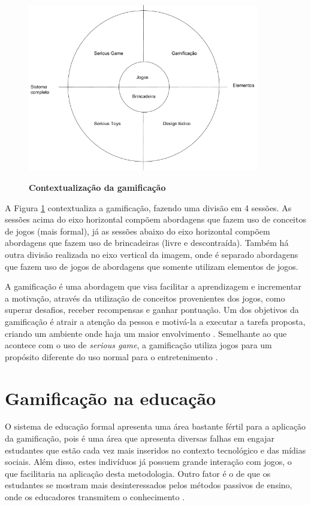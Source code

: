 \documentclass[
	12pt,				%
	oneside,			%
	a4paper,			%
	english,			%
	french,				%
	spanish,			%
	brazil,				%
	]{abntex2}
\begin{document}
\begin{figure}[ht]
\centering
\caption{\textbf{Contextualização da gamificação }}
\includegraphics[width=0.9\textwidth]{imagens/gamificacao.png}
\label{fig:gamificacao}
\end{figure}

A Figura \ref{fig:gamificacao} contextualiza a gamificação, fazendo uma divisão em 4 sessões. As sessões acima do eixo horizontal compõem abordagens que fazem uso de conceitos de jogos (mais formal), já as sessões abaixo do eixo horizontal compõem abordagens que fazem uso de brincadeiras (livre e descontraída). Também há outra divisão realizada no eixo vertical da imagem, onde é separado abordagens que fazem uso de jogos  de abordagens que somente utilizam elementos de jogos.

A gamificação é uma abordagem que visa facilitar a aprendizagem e incrementar a motivação, através da utilização de conceitos provenientes dos jogos, como superar desafios, receber recompensas e ganhar pontuação. Um dos objetivos da gamificação é atrair a atenção da pessoa e motivá-la a executar a tarefa proposta, criando um ambiente onde haja um maior envolvimento \cite{kaap:2014}. Semelhante ao que acontece com o uso de \textit{serious game}, a gamificação utiliza jogos para um propósito diferente do uso normal para o entretenimento \cite{deterding2011game}.

\section{Gamificação na educação}

O sistema de educação formal apresenta uma área bastante fértil para a aplicação da gamificação, pois é uma área que apresenta diversas falhas em engajar estudantes que estão cada vez mais inseridos no contexto tecnológico e das mídias sociais. Além disso, estes indivíduos já possuem grande interação com jogos, o que facilitaria na aplicação desta metodologia. Outro fator é o de que os estudantes se mostram mais desinteressados pelos métodos passivos de ensino, onde os educadores transmitem o conhecimento \cite{fardo2013gamificaccao}. 
\end{document}
